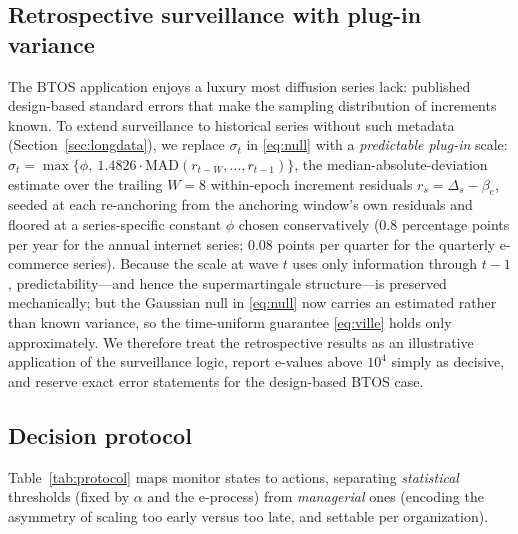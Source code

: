 \documentclass[review,authoryear,12pt]{elsarticle}
\begin{document}
\subsection{Retrospective surveillance with plug-in variance}
\label{sec:plugin}

The BTOS application enjoys a luxury most diffusion series lack: published design-based standard errors that make the sampling distribution of increments known. To extend surveillance to historical series without such metadata (Section~\ref{sec:longdata}), we replace $\sigma_t$ in \eqref{eq:null} with a \emph{predictable plug-in} scale: $\hat{\sigma}_t = \max\{\phi,\ 1.4826 \cdot \mathrm{MAD}(r_{t-W}, \dots, r_{t-1})\}$, the median-absolute-deviation estimate over the trailing $W = 8$ within-epoch increment residuals $r_s = \Delta_s - \beta_e$, seeded at each re-anchoring from the anchoring window's own residuals and floored at a series-specific constant $\phi$ chosen conservatively (0.8 percentage points per year for the annual internet series; 0.08 points per quarter for the quarterly e-commerce series). Because the scale at wave $t$ uses only information through $t-1$, predictability---and hence the supermartingale structure---is preserved mechanically; but the Gaussian null in \eqref{eq:null} now carries an estimated rather than known variance, so the time-uniform guarantee \eqref{eq:ville} holds only approximately. We therefore treat the retrospective results as an illustrative application of the surveillance logic, report e-values above $10^4$ simply as decisive, and reserve exact error statements for the design-based BTOS case.

\subsection{Decision protocol}
\label{sec:protocol}

Table~\ref{tab:protocol} maps monitor states to actions, separating \emph{statistical} thresholds (fixed by $\alpha$ and the e-process) from \emph{managerial} ones (encoding the asymmetry of scaling too early versus too late, and settable per organization).
\end{document}
